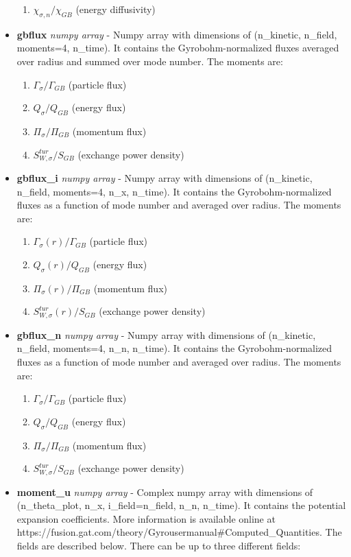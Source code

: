 \documentclass{article}
\begin{document}
\begin{itemize}
\begin{enumerate}
\item $\chi_{\sigma,n}/\chi_{GB}$ (energy diffusivity)
\end{enumerate}
\item \textbf{gbflux}\emph{ numpy array} - Numpy array with dimensions of (n\_kinetic, n\_field, moments=4, n\_time).  It contains the Gyrobohm-normalized fluxes averaged over radius and summed over mode number.  The moments are:
\begin{enumerate}
\item $\Gamma_\sigma/\Gamma_{GB}$ (particle flux)
\item $Q_\sigma/Q_{GB}$ (energy flux)
\item $\Pi_\sigma/\Pi_{GB}$ (momentum flux)
\item $S^{tur}_{W,\sigma}/S_{GB}$ (exchange power density)
\end{enumerate}
\item \textbf{gbflux\_i}\emph{ numpy array} - Numpy array with dimensions of (n\_kinetic, n\_field, moments=4, n\_x, n\_time).  It contains the Gyrobohm-normalized fluxes as a function of mode number and averaged over radius.  The moments are:
\begin{enumerate}
\item $\Gamma_\sigma(r)/\Gamma_{GB}$ (particle flux)
\item $Q_\sigma(r)/Q_{GB}$ (energy flux)
\item $\Pi_\sigma(r)/\Pi_{GB}$ (momentum flux)
\item $S^{tur}_{W,\sigma}(r)/S_{GB}$ (exchange power density)
\end{enumerate}
\item \textbf{gbflux\_n}\emph{ numpy array} - Numpy array with dimensions of (n\_kinetic, n\_field, moments=4, n\_n, n\_time).  It contains the Gyrobohm-normalized fluxes as a function of mode number and averaged over radius.  The moments are:
\begin{enumerate}
\item $\Gamma_\sigma/\Gamma_{GB}$ (particle flux)
\item $Q_\sigma/Q_{GB}$ (energy flux)
\item $\Pi_\sigma/\Pi_{GB}$ (momentum flux)
\item $S^{tur}_{W,\sigma}/S_{GB}$ (exchange power density)
\end{enumerate}
\item \textbf{moment\_u}\emph{ numpy array} - Complex numpy array with dimensions of (n\_theta\_plot, n\_x, i\_field=n\_field, n\_n, n\_time).  It contains the potential expansion coefficients.  More information is available online at https://fusion.gat.com/theory/Gyrousermanual\#Computed\_Quantities.  The fields are described below.  There can be up to three different fields:

\end{itemize}
\end{document}

